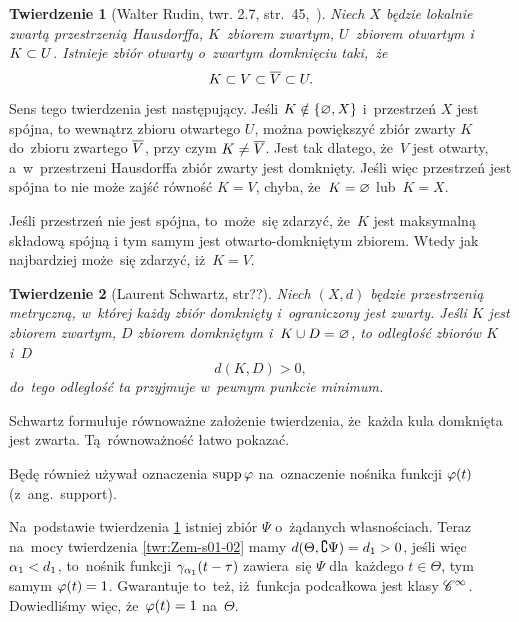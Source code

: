 \documentclass[a4paper,11pt]{article}
\newtheorem{twr}{Twierdzenie} %
\begin{document}
\begin{twr}[Walter Rudin, twr. 2.7, str.~45,~\cite{Rudin98}]
  \label{twr:Zem-s01-01}
  Niech $X$ będzie lokalnie zwartą przestrzenią Hausdorffa,
  $K$~zbiorem zwartym, $U$~zbiorem otwartym i~$K \subset U$. Istnieje
  zbiór otwarty o~zwartym domknięciu taki,~że
  \begin{equation}
    \label{eq:Zem-s01-04}
    K \subset V \subset \overline{ V } \subset U.
  \end{equation}
\end{twr}
Sens tego twierdzenia jest następujący. Jeśli $K \notin \{ \varnothing, X \}$
i~przestrzeń $X$ jest spójna, to wewnątrz zbioru otwartego $U$, można
powiększyć zbiór zwarty $K$ do~zbioru zwartego $\overline{ V }$, przy czym
$K \neq \overline{ V }$. Jest tak dlatego, że~$V$ jest otwarty,
a~w~przestrzeni Hausdorffa zbiór zwarty jest domknięty. Jeśli więc
przestrzeń jest spójna to nie może zajść równość $K = V$, chyba,
że~$K = \varnothing$ lub~$K = X$.

Jeśli przestrzeń nie jest spójna, to~może~się zdarzyć, że~$K$ jest
maksymalną składową spójną i tym samym jest otwarto-domkniętym
zbiorem. Wtedy jak najbardziej może~się zdarzyć, iż~$K = V$.

\begin{twr}[Laurent Schwartz, str??\cite{Schwartz79}]
  \label{twr:Zem-s01-02}
  Niech $( X, d )$ będzie przestrzenią metryczną, w~której każdy zbiór
  domknięty i~ograniczony jest zwarty. Jeśli $K$ jest zbiorem zwartym,
  $D$ zbiorem domkniętym i~$K \cup D = \varnothing$, to odległość zbiorów $K$
  i~$D$
  \begin{equation}
    \label{eq:Zem-s01-05}
    d( K, D ) > 0,
  \end{equation}
  do~tego odległość ta przyjmuje w~pewnym punkcie minimum.
\end{twr}
\noi Schwartz formułuje równoważne założenie twierdzenia, że~każda
kula domknięta jest zwarta. Tą~równoważność łatwo pokazać.

Będę również używał oznaczenia $\mathrm{supp}\, \varphi$ na~oznaczenie nośnika
funkcji $\varphi( t )$ (z~ang.~support).

\vspace{\spaceFour}


\start {}  Na~podstawie
twierdzenia \ref{twr:Zem-s01-01} istniej zbiór $\Psi$ o~żądanych
własnościach. Teraz na~mocy twierdzenia \eqref{twr:Zem-s01-02} mamy
$d( \Theta, \complement \Psi ) = d_{ 1 } > 0$, jeśli więc
$\alpha_{ 1 } < d_{ 1 }$, to~nośnik funkcji
$\gamma_{ \alpha_{ 1 } }( t - \tau )$ zawiera~się $\Psi$ dla~każdego
$t \in \Theta$, tym samym $\varphi( t ) = 1$. Gwarantuje to~też,
iż~funkcja podcałkowa jest klasy $\mathcal{C}^{ \infty }$. Dowiedliśmy więc,
że~$\varphi( t ) = 1$ na~$\Theta$.
\end{document}
